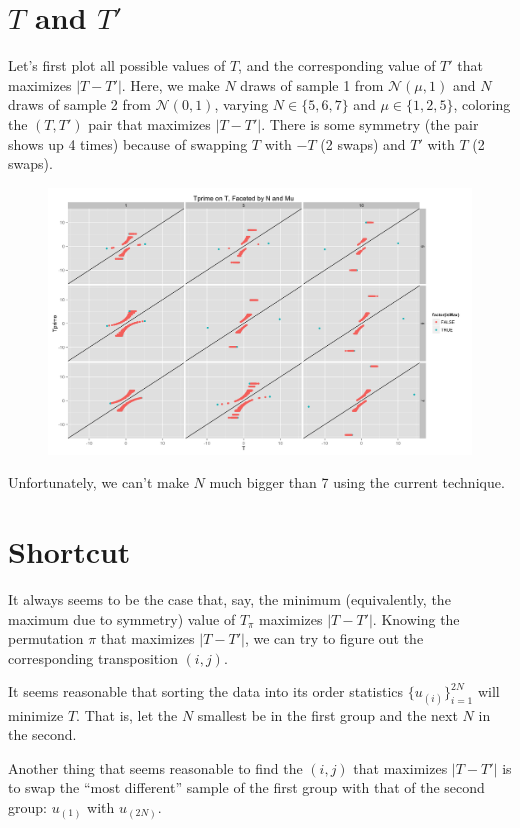 \section{$T$ and $T'$}
Let's first plot all possible values of $T$, and the corresponding
value of $T'$ that maximizes $|T-T'|$.  Here, we make $N$ draws of
sample 1 from $\mathcal{N}(\mu, 1)$ and $N$ draws of sample 2 from
$\mathcal{N}(0, 1)$, varying $N \in \{5, 6, 7\}$ and $\mu \in \{1, 2,
5\}$, coloring the $(T, T')$ pair that maximizes $|T-T'|$.  There is
some symmetry (the pair shows up 4 times) because of swapping $T$ with
$-T$ (2 swaps) and $T'$ with $T$ (2 swaps).

\begin{figure}[!ht]
  \centering
  \includegraphics[scale=.12]{./simulations/better_bound_condition/t_tprime_plot.png}
\end{figure}

Unfortunately, we can't make $N$ much bigger than 7 using the current
technique.  
\clearpage

\section{Shortcut}
It always seems to be the case that, say, the minimum (equivalently,
the maximum due to symmetry) value of $T_{\pi}$ maximizes $|T - T'|$.
Knowing the permutation $\pi$ that maximizes $|T - T'|$, we can try to
figure out the corresponding transposition $(i, j)$.  

It seems reasonable that sorting the data into its order statistics
$\{u_{(i)}\}_{i=1}^{2N}$ will minimize $T$.  That is, let the $N$
smallest be in the first group and the next $N$ in the second.  

Another thing that seems reasonable to find the $(i, j)$ that maximizes
$|T - T'|$ is to swap the ``most different'' sample of the first group
with that of the second group: $u_{(1)}$ with $u_{(2N)}$.

